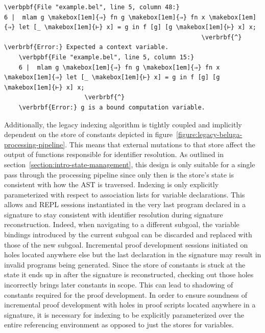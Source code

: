\begin{Verbatim}[commandchars=\\\{\}, baselinestretch=1]
\verbpbf{File "example.bel", line 5, column 48:}
6 |  mlam g \makebox[1em]{⇒} fn g \makebox[1em]{⇒} fn x \makebox[1em]{⇒} let [_ \makebox[1em]{⊢} x] = g in f [g] [g \makebox[1em]{⊢} x] x;
                                                      \verbrbf{^}
\verbrbf{Error:} Expected a context variable.
    \verbpbf{File "example.bel", line 5, column 15:}
    6 |  mlam g \makebox[1em]{⇒} fn g \makebox[1em]{⇒} fn x \makebox[1em]{⇒} let [_ \makebox[1em]{⊢} x] = g in f [g] [g \makebox[1em]{⊢} x] x;
                      \verbrbf{^}
    \verbrbf{Error:} g is a bound computation variable.
\end{Verbatim}
\endgroup

Additionally, the legacy indexing algorithm is tightly coupled and implicitly dependent on the store of constants depicted in figure~\ref{figure:legacy-beluga-processing-pipeline}.
This means that external mutations to that store affect the output of functions responsible for identifier resolution.
As outlined in section~\ref{section:intro-state-management}, this design is only suitable for a single pass through the processing pipeline since only then is the store's state is consistent with how the \ac{AST} is traversed.
Indexing is only explicitly parameterized with respect to association lists for variable declarations.
This allows \Harpoon and \ac{REPL} sessions instantiated in the very last program declared in a \Beluga signature to stay consistent with identifier resolution during signature reconstruction.
Indeed, when navigating to a different \Harpoon subgoal, the variable bindings introduced by the current subgoal can be discarded and replaced with those of the new subgoal.
Incremental proof development sessions initiated on holes located anywhere else but the last declaration in the signature may result in invalid programs being generated.
Since the store of constants is stuck at the state it ends up in after the signature is reconstructed, checking out those holes incorrectly brings later constants in scope.
This can lead to shadowing of constants required for the proof development.
In order to ensure soundness of incremental proof development with holes in proof scripts located anywhere in a signature, it is necessary for indexing to be explicitly parameterized over the entire referencing environment as opposed to just the stores for variables.

